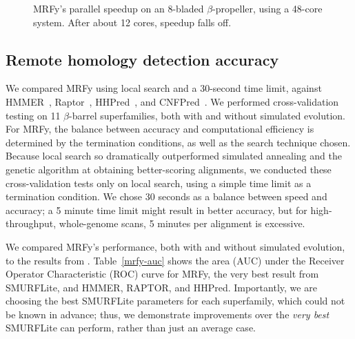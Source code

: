 \documentclass{acm_proc_article-sp}
\begin{document}
\begin{figure}[htb!]
\begin{center}
   \caption{MRFy's parallel speedup on an 8-bladed $\beta$-propeller, using a
   48-core system.
   After about 12 cores, speedup falls off.}
   \label{speedup}
 \end{center}
\end{figure}

\subsection{Remote homology detection accuracy}

We compared MRFy using local search and a 30-second time limit, against 
HMMER~\cite{Eddy:1998ut},
Raptor~\cite{Xu:2003p3417}, HHPred~\cite{Soding:2005ff}, 
and CNFPred~\cite{JianzhuMa:2012cp}.
We performed cross-validation testing on 11 $\beta$-barrel superfamilies, both
with and without simulated evolution.
For MRFy, the balance between accuracy and computational efficiency is 
determined by the termination conditions, as well as the search technique 
chosen.
Because local search so dramatically outperformed simulated annealing and the
genetic algorithm at obtaining better-scoring alignments, we conducted these 
cross-validation tests only on local search, using a simple time limit as a
termination condition.
We chose 30 seconds as a balance between speed and accuracy; a 5 minute time
limit might result in better accuracy, but for high-throughput, whole-genome 
scans, 5 minutes per alignment is excessive.

We compared MRFy's performance, both with and without simulated evolution, to 
the results from \citet{Daniels:2012dg}.
Table~\ref{mrfy-auc} shows the area (AUC) under the Receiver Operator 
Characteristic (ROC) curve for MRFy, the very best result from SMURFLite, and
HMMER, RAPTOR, and HHPred.
Importantly, we are choosing the best SMURFLite parameters for each superfamily,
which could not be known in advance; thus, we demonstrate improvements over the
\emph{very best} SMURFLite can perform, rather than just an average case.
\end{document}
